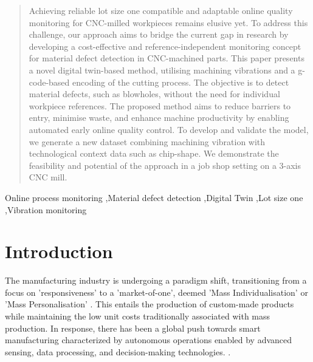 \documentclass[5p,times,procedia]{elsarticle}
\begin{document}
\begin{frontmatter}
\begin{abstract}
Achieving reliable lot size one compatible and adaptable online quality monitoring for CNC-milled workpieces remains elusive yet.
To address this challenge, our approach aims to bridge the current gap in research by developing a cost-effective and reference-independent monitoring concept for material defect detection in CNC-machined parts. This paper presents a novel digital twin-based method, utilising machining vibrations and a g-code-based encoding of the cutting process. The objective is to detect material defects, such as blowholes, without the need for individual workpiece references. The proposed method aims to reduce barriers to entry, minimise waste, and enhance machine productivity by enabling automated early online quality control. To develop and validate the model, we generate a new dataset combining machining vibration with technological context data such as chip-shape. We demonstrate the feasibility and potential of the approach in a job shop setting on a 3-axis CNC mill.
\end{abstract}

\begin{keyword}
 Online process monitoring \sep Material defect detection \sep Digital Twin \sep Lot size one \sep Vibration monitoring





\end{keyword}

\end{frontmatter}


\section{Introduction}\label{Sec_Introduction}


The manufacturing industry is undergoing a paradigm shift, transitioning from a focus on 'responsiveness' to a 'market-of-one', deemed 'Mass Individualisation' \cite{Lu.Xu.ea2020} or 'Mass Personalisation' \cite{Qin.Lu2021}. This entails the production of custom-made products while maintaining the low unit costs traditionally associated with mass production.
In response, there has been a global push towards smart manufacturing characterized by autonomous operations enabled by advanced sensing, data processing, and decision-making technologies. \cite{Gu.Koren2022, Lu.Morris.ea2016}.
\end{document}
